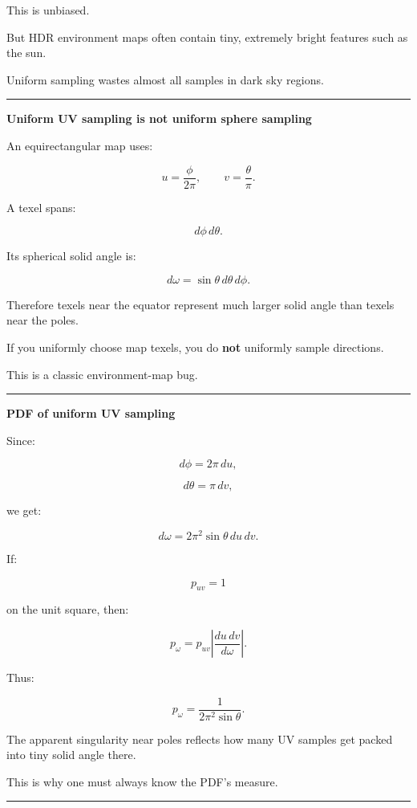 This is unbiased.

But HDR environment maps often contain tiny, extremely bright features such as the sun.

Uniform sampling wastes almost all samples in dark sky regions.

\begin{center}\rule{0.5\linewidth}{0.5pt}\end{center}

\textbf{Uniform UV sampling is not uniform sphere sampling}

An equirectangular map uses:

\[
u=\frac{\phi}{2\pi},
\qquad
v=\frac{\theta}{\pi}.
\]

A texel spans:

\[
d\phi\,d\theta.
\]

Its spherical solid angle is:

\[
\boxed{
d\omega
=
\sin\theta
\,d\theta\,d\phi.
}
\]

Therefore texels near the equator represent much larger solid angle than texels near the poles.

If you uniformly choose map texels, you do \textbf{not} uniformly sample directions.

This is a classic environment-map bug.

\begin{center}\rule{0.5\linewidth}{0.5pt}\end{center}

\textbf{PDF of uniform UV sampling}

Since:

\[
d\phi=2\pi\,du,
\]

\[
d\theta=\pi\,dv,
\]

we get:

\[
d\omega
=
2\pi^2
\sin\theta
\,du\,dv.
\]

If:

\[
p_{uv}=1
\]

on the unit square, then:

\[
p_\omega
=
p_{uv}
\left|
\frac{
du\,dv
}{
d\omega
}
\right|.
\]

Thus:

\[
\boxed{
p_\omega
=
\frac{
1
}{
2\pi^2\sin\theta
}.
}
\]

The apparent singularity near poles reflects how many UV samples get packed into tiny solid angle there.

This is why one must always know the PDF's measure.

\begin{center}\rule{0.5\linewidth}{0.5pt}\end{center}

